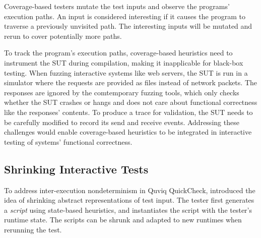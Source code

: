 Coverage-based testers mutate the test inputs and observe the programs'
execution paths.  An input is considered interesting if it causes the program to
traverse a previously unvisited path.  The interesting inputs will be mutated
and rerun to cover potentially more paths.

To track the program's execution paths, coverage-based heuristics need to
instrument the SUT during compilation, making it inapplicable for black-box
testing.  When fuzzing interactive systems like web servers, the SUT is run in a
simulator where the requests are provided as files instead of network packets.
The responses are ignored by the comtemporary fuzzing tools, which only checks
whether the SUT crashes or hangs and does not care about functional correctness
like the responses' contents.  To produce a trace for validation, the SUT needs
to be carefully modified to record its send and receive events.  Addressing
these challenges would enable coverage-based heuristics to be integrated in
interactive testing of systems' functional correctness.

\subsection{Shrinking Interactive Tests}
\label{sec:related-shrink}

To address inter-execution nondeterminism in Quviq QuickCheck,
\citet{Hughes2016} introduced the idea of shrinking abstract representations of
test input.  The tester first generates a {\em script} using state-based
heuristics, and instantiates the script with the tester's runtime state.  The
scripts can be shrunk and adapted to new runtimes when rerunning the test.

